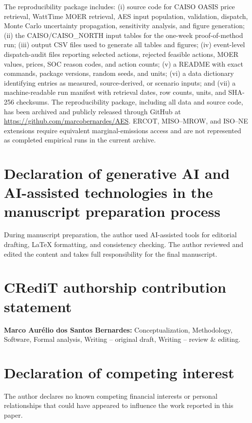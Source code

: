 \documentclass[cleantechnol,article,submit,pdftex,moreauthors]{Definitions/mdpi}
\begin{document}
The reproducibility package includes: (i) source code for CAISO OASIS price retrieval, WattTime MOER retrieval, AES input population, validation, dispatch, Monte Carlo uncertainty propagation, sensitivity analysis, and figure generation; (ii) the CAISO/CAISO\_NORTH input tables for the one-week proof-of-method run; (iii) output CSV files used to generate all tables and figures; (iv) event-level dispatch-audit files reporting selected actions, rejected feasible actions, MOER values, prices, SOC reason codes, and action counts; (v) a README with exact commands, package versions, random seeds, and units; (vi) a data dictionary identifying entries as measured, source-derived, or scenario inputs; and (vii) a machine-readable run manifest with retrieval dates, row counts, units, and SHA-256 checksums. The reproducibility package, including all data and source code, has been archived and publicly released through GitHub at \url{https://github.com/marcobernardes/AES}. ERCOT, MISO--MROW, and ISO--NE extensions require equivalent marginal-emissions access and are not represented as completed empirical runs in the current archive.



\section*{Declaration of generative AI and AI-assisted technologies in the manuscript preparation process}

During manuscript preparation, the author used AI-assisted tools for editorial drafting, LaTeX formatting, and consistency checking. The author reviewed and edited the content and takes full responsibility for the final manuscript.


\section*{CRediT authorship contribution statement}

\textbf{Marco Aur\'elio dos Santos Bernardes:} Conceptualization, Methodology, Software, Formal analysis, Writing -- original draft, Writing -- review \& editing.


\section*{Declaration of competing interest}

The author declares no known competing financial interests or personal relationships that could have appeared to influence the work reported in this paper.
\end{document}
